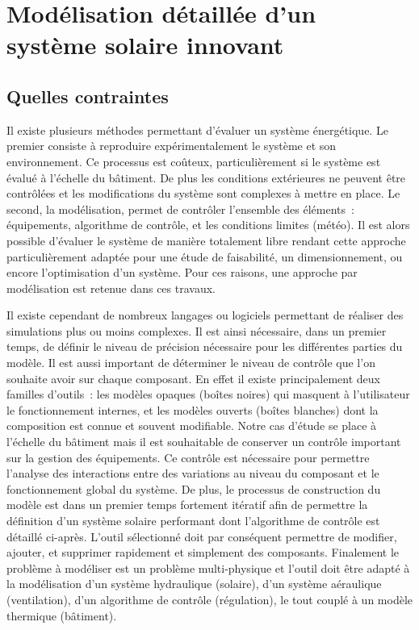 
\section{Modélisation détaillée d’un système solaire innovant} %
\label{sec:modelisation_detaillee_d_un_systeme_solaire_innovant}
\subsection{Quelles contraintes} %
\label{sub:quelles_contraintes}
Il existe plusieurs méthodes permettant d’évaluer un système énergétique. Le premier
consiste à reproduire expérimentalement le système et son environnement. Ce processus est
coûteux, particulièrement si le système est évalué à l’échelle du bâtiment. De plus les
conditions extérieures ne peuvent être contrôlées et les modifications du système sont complexes à mettre en place.
Le second, la modélisation, permet de contrôler l’ensemble des éléments~: équipements,
algorithme de contrôle, et les conditions limites (météo).
Il est alors possible d’évaluer le système de
manière totalement libre rendant cette approche particulièrement adaptée pour une
étude de faisabilité, un dimensionnement, ou encore l’optimisation d’un système. Pour ces raisons,
une approche par modélisation est retenue dans ces travaux.

Il existe cependant de nombreux langages ou logiciels permettant de réaliser des
simulations plus ou moins complexes. Il est ainsi nécessaire, dans un premier temps, de
définir le niveau de précision nécessaire pour les différentes parties du modèle. Il est
aussi important de déterminer le niveau de contrôle que l’on souhaite avoir sur chaque
composant. En effet il existe principalement deux familles d’outils~: les modèles opaques
(boîtes noires) qui masquent à l’utilisateur le fonctionnement internes, et les modèles
ouverts (boîtes blanches) dont la composition est connue et souvent modifiable. Notre cas
d’étude se place à l’échelle du bâtiment mais il est souhaitable de conserver un contrôle
important sur la gestion des équipements. Ce contrôle est nécessaire pour permettre
l’analyse des interactions entre des variations au niveau du composant et le
fonctionnement global du système. De plus, le processus de construction du modèle est dans un
premier temps fortement itératif afin de permettre la définition d’un système solaire
performant dont l’algorithme de contrôle est détaillé ci-après. L’outil sélectionné doit par conséquent
permettre de modifier, ajouter, et supprimer rapidement et simplement des composants. Finalement le
problème à modéliser est un problème multi-physique et l’outil doit être adapté à la
modélisation d’un système hydraulique (solaire), d’un système aéraulique (ventilation),
d’un algorithme de contrôle (régulation), le tout couplé à un modèle thermique (bâtiment).



